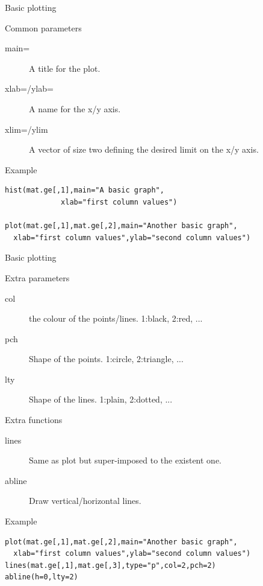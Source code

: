 \documentclass[10pt]{beamer}
\begin{document}

\begin{frame}[fragile]{Basic plotting}
  \begin{block}{Common parameters}
    \begin{description}
    \item[main=] A title for the plot.
    \item[xlab=/ylab=] A name for the x/y axis.
    \item[xlim=/ylim] A {\sf vector} of size two defining the desired limit on the x/y axis.
    \end{description}
  \end{block}
  \begin{exampleblock}{Example}
\begin{verbatim}
hist(mat.ge[,1],main="A basic graph",
             xlab="first column values")

plot(mat.ge[,1],mat.ge[,2],main="Another basic graph",
  xlab="first column values",ylab="second column values")
\end{verbatim}  
  \end{exampleblock}
\end{frame}


\begin{frame}[fragile]{Basic plotting}
  \begin{block}{Extra parameters}
    \begin{description}
      \item[col] the colour of the points/lines. 1:black, 2:red, ...
      \item[pch] Shape of the points. 1:circle, 2:triangle, ...
      \item[lty] Shape of the lines. 1:plain, 2:dotted, ...
    \end{description}
  \end{block}
  \begin{block}{Extra functions}
    \begin{description}
      \item[lines] Same as plot but super-imposed to the existent one.
      \item[abline] Draw vertical/horizontal lines.  
    \end{description}
  \end{block}
  \begin{exampleblock}{Example}
\begin{verbatim}
plot(mat.ge[,1],mat.ge[,2],main="Another basic graph",
  xlab="first column values",ylab="second column values")
lines(mat.ge[,1],mat.ge[,3],type="p",col=2,pch=2)
abline(h=0,lty=2)
\end{verbatim}  
  \end{exampleblock}
\end{frame}
\end{document}
